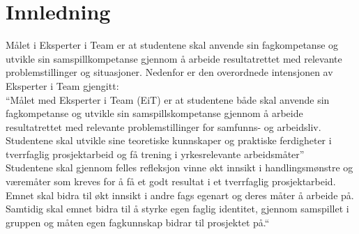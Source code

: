 \section{Innledning}
Målet i Eksperter i Team er at studentene skal anvende sin fagkompetanse
og utvikle sin samspillkompetanse gjennom å arbeide resultatrettet med
relevante problemstillinger og situasjoner. Nedenfor er den overordnede
intensjonen av Eksperter i Team gjengitt:\\

``Målet med Eksperter i Team (EiT) er at studentene både skal anvende
sin fagkompetanse og utvikle sin samspillskompetanse gjennom å arbeide
resultatrettet med relevante problemstillinger for samfunns- og
arbeidsliv. Studentene skal utvikle sine teoretiske kunnskaper og
praktiske ferdigheter i tverrfaglig prosjektarbeid og få trening i
yrkesrelevante arbeidsmåter''\\

Studentene skal gjennom felles refleksjon vinne økt innsikt i
handlingsmønstre og væremåter som kreves for å få et godt resultat i et
tverrfaglig prosjektarbeid. Emnet skal bidra til økt innsikt i andre
fags egenart og deres måter å arbeide på. Samtidig skal emnet bidra til
å styrke egen faglig identitet, gjennom samspillet i gruppen og måten
egen fagkunnskap bidrar til prosjektet på.``
